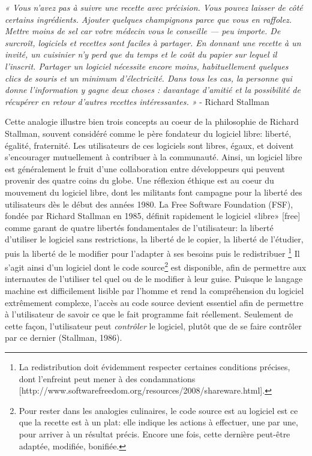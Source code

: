 \documentclass[
  letterpaper,
]{scrbook}
\begin{document}
\emph{« Vous n'avez pas à suivre une recette avec précision. Vous pouvez
laisser de côté certains ingrédients. Ajouter quelques champignons parce
que vous en raffolez. Mettre moins de sel car votre médecin vous le
conseille --- peu importe. De surcroît, logiciels et recettes sont
faciles à partager. En donnant une recette à un invité, un cuisinier n'y
perd que du temps et le coût du papier sur lequel il l'inscrit. Partager
un logiciel nécessite encore moins, habituellement quelques clics de
souris et un minimum d'électricité. Dans tous les cas, la personne qui
donne l'information y gagne deux choses : davantage d'amitié et la
possibilité de récupérer en retour d'autres recettes intéressantes. »} -
Richard Stallman

Cette analogie illustre bien trois concepts au coeur de la philosophie
de Richard Stallman, souvent considéré comme le père fondateur du
logiciel libre: liberté, égalité, fraternité. Les utilisateurs de ces
logiciels sont libres, égaux, et doivent s'encourager mutuellement à
contribuer à la communauté. Ainsi, un logiciel libre est généralement le
fruit d'une collaboration entre développeurs qui peuvent provenir des
quatre coins du globe. Une réflexion éthique est au coeur du mouvement
du logiciel libre, dont les militants font campagne pour la liberté des
utilisateurs dès le début des années 1980. La Free Software Foundation
(FSF), fondée par Richard Stallman en 1985, définit rapidement le
logiciel «libre» {[}free{]} comme garant de quatre libertés
fondamentales de l'utilisateur: la liberté d'utiliser le logiciel sans
restrictions, la liberté de le copier, la liberté de l'étudier, puis la
liberté de le modifier pour l'adapter à ses besoins puis le redistribuer
\footnote{La redistribution doit évidemment respecter certaines
  conditions précises, dont l'enfreint peut mener à des condamnations
  {[}http://www.softwarefreedom.org/resources/2008/shareware.html{]}.}
Il s'agit ainsi d'un logiciel dont le code source\footnote{Pour rester
  dans les analogies culinaires, le code source est au logiciel est ce
  que la recette est à un plat: elle indique les actions à effectuer,
  une par une, pour arriver à un résultat précis. Encore une fois, cette
  dernière peut-être adaptée, modifiée, bonifiée.} est disponible, afin
de permettre aux internautes de l'utiliser tel quel ou de le modifier à
leur guise. Puisque le langage machine est difficilement lisible par
l'homme et rend la compréhension du logiciel extrêmement complexe,
l'accès au code source devient essentiel afin de permettre à
l'utilisateur de savoir ce que le fait programme fait réellement.
Seulement de cette façon, l'utilisateur peut \emph{contrôler} le
logiciel, plutôt que de se faire contrôler par ce dernier (Stallman,
1986).
\end{document}
